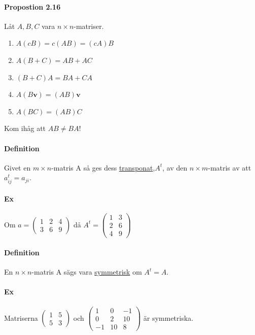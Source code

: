 \paragraph{Propostion 2.16} Låt $A,B,C$ vara $n\times n$-matriser.
\begin{enumerate}
    \item $A(cB)=c(AB)=(cA)B$
    \item $A(B+C)=AB+AC$
    \item $(B+C)A=BA+CA$
    \item $A(B\bm{v})=(AB)\bm{v}$
    \item $A(BC)=(AB)C$
\end{enumerate}
Kom ihåg att $AB\neq BA$!

\paragraph{Definition} Givet en $m\times n$-matris A så ges dess \underline{transponat},$A^{t}$, av den $n\times m$-matris av att $a^{t}_{ij}=a_{ji}$.

\paragraph{Ex} Om $a=\begin{pmatrix}
    1&2&4\\3&6&9
\end{pmatrix}$ då $A^{t}=\begin{pmatrix}
    1&3\\2&6\\4&9
\end{pmatrix}$

\paragraph{Definition} En $n\times n$-matris A sägs vara \underline{symmetrisk} om $A^{t}=A$.

\paragraph{Ex} Matriserna $\begin{pmatrix}1&5\\5&3\end{pmatrix}$ och $\begin{pmatrix}1&0&-1\\0&2&10\\-1&10&8\end{pmatrix}$ är symmetriska.

